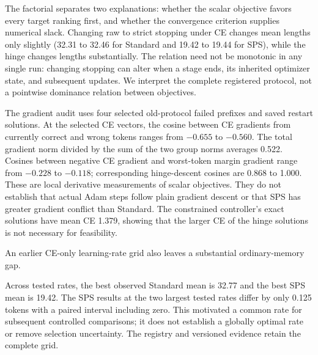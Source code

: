 \begin{table}[t]
 \centering
 \small
 
 \caption{Ordinary-memory factorial at the matched original budget. Loss and stopping margin are crossed rather than conflated. The scalar CE and squared-margin objectives are defined in \cref{eq:objective}; raw stopping uses argmax matching and strict stopping requires a positive target gap.}
 \label{tab:factorial}
\end{table}

The factorial separates two explanations: whether the scalar objective favors every target ranking first, and whether the convergence criterion supplies numerical slack.
Changing raw to strict stopping under CE changes mean lengths only slightly (32.31 to 32.46 for Standard and 19.42 to 19.44 for SPS), while the hinge changes lengths substantially.
The relation need not be monotonic in any single run: changing stopping can alter when a stage ends, its inherited optimizer state, and subsequent updates.
We interpret the complete registered protocol, not a pointwise dominance relation between objectives.

The gradient audit uses four selected old-protocol failed prefixes and saved restart solutions.
At the selected CE vectors, the cosine between CE gradients from currently correct and wrong tokens ranges from $-0.655$ to $-0.560$.
The total gradient norm divided by the sum of the two group norms averages 0.522.
Cosines between negative CE gradient and worst-token margin gradient range from $-0.228$ to $-0.118$; corresponding hinge-descent cosines are 0.868 to 1.000.
These are local derivative measurements of scalar objectives.
They do not establish that actual Adam steps follow plain gradient descent or that SPS has greater gradient conflict than Standard.
The constrained controller's exact solutions have mean CE 1.379, showing that the larger CE of the hinge solutions is not necessary for feasibility.

An earlier CE-only learning-rate grid also leaves a substantial ordinary-memory gap.
\begin{table}[htbp]
 \centering
 \small
 
 \caption{The four registered CE learning-rate sweep variants. Values are equal-text teacher-forced horizons on the matched cohort; these are measured configurations rather than a globally optimal-rate search.}
 \label{tab:lr-sweep}
\end{table}
Across tested rates, the best observed Standard mean is 32.77 and the best SPS mean is 19.42.
The SPS results at the two largest tested rates differ by only 0.125 tokens with a paired interval including zero.
This motivated a common rate for subsequent controlled comparisons; it does not establish a globally optimal rate or remove selection uncertainty.
The registry and versioned evidence retain the complete grid.

